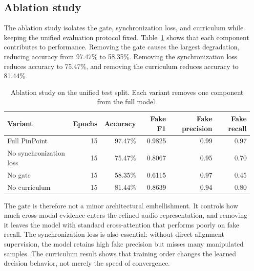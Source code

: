 \documentclass[preprint,12pt,number]{elsarticle}
\begin{document}
\subsection{Ablation study}
\label{subsec:ablations}

The ablation study isolates the gate, synchronization loss, and curriculum while keeping the unified evaluation protocol fixed. Table~\ref{tab:ablation} shows that each component contributes to performance. Removing the gate causes the largest degradation, reducing accuracy from 97.47\% to 58.35\%. Removing the synchronization loss reduces accuracy to 75.47\%, and removing the curriculum reduces accuracy to 81.44\%.

\begin{table}[H]
\caption{Ablation study on the unified test split. Each variant removes one component from the full model.}
\label{tab:ablation}
\centering
\small
\setlength{\tabcolsep}{3pt}
\begin{tabular}{lrrrrr}
\toprule
Variant & Epochs & Accuracy & Fake F1 & Fake precision & Fake recall \\
\midrule
Full PinPoint & 15 & 97.47\% & 0.9825 & 0.99 & 0.97 \\
No synchronization loss & 15 & 75.47\% & 0.8067 & 0.95 & 0.70 \\
No gate & 15 & 58.35\% & 0.6115 & 0.97 & 0.45 \\
No curriculum & 15 & 81.44\% & 0.8639 & 0.94 & 0.80 \\
\bottomrule
\end{tabular}
\end{table}

The gate is therefore not a minor architectural embellishment. It controls how much cross-modal evidence enters the refined audio representation, and removing it leaves the model with standard cross-attention that performs poorly on fake recall. The synchronization loss is also essential: without direct alignment supervision, the model retains high fake precision but misses many manipulated samples. The curriculum result shows that training order changes the learned decision behavior, not merely the speed of convergence.
\end{document}
